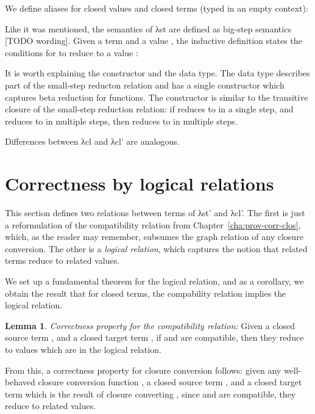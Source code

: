 \documentclass[bsc,frontabs,oneside,singlespacing,parskip,deptreport]{infthesis}
\theoremstyle{definition}
\theoremstyle{lemma}
\newtheorem*{lemma}{Lemma}
\begin{document}
We define aliases for closed values  and closed terms
 (typed in an empty context):


Like it was mentioned, the semantics of λst are defined as big-step
semantics [TODO wording]. Given a term  and a value , the
inductive definition  states the conditions for  to
reduce to a value :


It is worth explaining the  constructor and the 
data type. The  data type describes part of the small-step
reducton relation and has a single constructor which captures beta
reduction for functions. The  constructor is similar to the
transitive closure of the small-step reduction relation: if 
reduces to  in a single step, and  reduces to  in
multiple steps, then  reduces to  in multiple steps.

Differences between λcl and λcl' are analogous.

\section{Correctness by logical relations}
\label{sec:corr-logic-relat}

This section defines two relations between terms of λst' and λcl'. The
first is just a reformulation of the compatibility relation from
Chapter~\ref{cha:prov-corr-clos}, which, as the reader may remember,
subsumes the graph relation of any closure conversion. The other is a
\textit{logical relation}, which captures the notion that related
terms reduce to related values.

We set up a fundamental theorem for the logical relation, and as a
corollary, we obtain the result that for closed terms, the compability
relation implies the logical relation.

\begin{lemma}
  \label{sec:corr-logic-relat-1}
  \emph{Correctness property for the compatibility relation:} Given a
  closed source term , and a closed target term , if
   and  are compatible, then they reduce to values which
  are in the logical relation.
\end{lemma}

From this, a correctness property for closure conversion follows:
given any well-behaved closure conversion function , a closed
source term , and a closed target term  which is the
result of closure converting , since  and  are
compatible, they reduce to related values.
\end{document}
